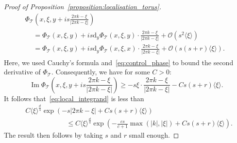 \documentclass[AHL,Unicode,longabstracts,published]{cedram}
\DeclareMathOperator{\im}{Im}
\newcommand{\p}[1]{\left(#1\right)}
\newcommand{\va}[1]{\left|#1\right|}
\newcommand{\brac}[1]{\langle #1 \rangle}
\newcommand{\clO}{\mathcal{O}}
\newcommand{\clT}{\mathcal{T}}
\newcommand{\rmd}{\mathrm{d}}
\newcommand{\clO}{\mathcal{O}}
\begin{document}
\begin{proof}[Proof of Proposition~\ref{proposition:localisation_torus}]
\begin{multline*}
\Phi_{\clT}\left(x,\xi,y + i s \frac{2 \pi k - \xi}{\va{2 \pi k - \xi}}\right) \\
\begin{aligned}
& = \Phi_{\clT}(x,\xi,y) + i s \rmd _y \Phi_{\clT}(x,\xi,y) \cdot \frac{2 \pi k - \xi}{\va{2 \pi k - \xi}} + \clO\p{s^2 \brac{\xi}} \\
& = \Phi_{\clT}(x,\xi,y) + i s \rmd _y \Phi_{\clT}(x,\xi,x) \cdot \frac{2 \pi k - \xi}{\va{2 \pi k - \xi}} + \clO\p{s (s+r) \brac{\xi}}.
\end{aligned}
\end{multline*}
Here, we used Cauchy's formula and~\eqref{eq:control_phase} to bound the second derivative of $\Phi_{\clT}$. Consequently, we have for some $C > 0$:
\begin{equation*}
\im \Phi_{\clT}\left(x,\xi,y + i s \frac{2 \pi k - \xi}{\va{2 \pi k - \xi}}\right) \geq - s \xi \cdot \frac{2 \pi k - \xi}{\va{2 \pi k - \xi}} - C s (s+r) \brac{\xi}.
\end{equation*}
It follows that~\eqref{eq:local_integrand} is less than
\begin{equation*}
\begin{split}
& C \brac{\xi}^{\frac{d}{4}} \exp\p{- s \va{2 \pi k - \xi} + C s (s+r) \brac{\xi}} \\ & \qquad \qquad \qquad \leq C \brac{\xi}^{\frac{d}{4}} \exp\p{ - \frac{cs}{c+1} \max(\va{k}, \va{\xi})+ C s (s+r) \brac{\xi} }.
\end{split}
\end{equation*}
The result then follows by taking $s$ and $r$ small enough.
\end{proof}
\end{document}
